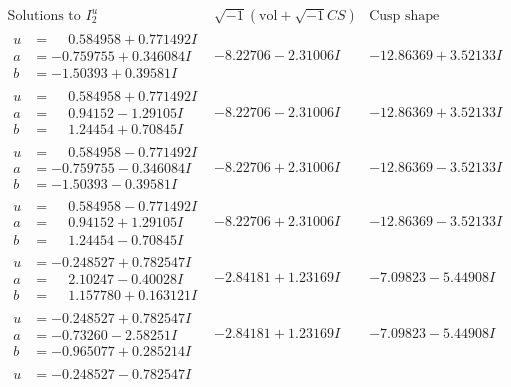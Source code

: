 \documentclass[1p]{elsarticle_modified}
\theoremstyle{definition}
\newcommand{\I}{\sqrt{-1}}
\begin{document}
$$\begin{array}{c|c|c}  
\text{Solutions to }I^u_{2}& \I (\text{vol} + \sqrt{-1}CS) & \text{Cusp shape}\\
 \hline 
\begin{aligned}
u &= \phantom{-}0.584958 + 0.771492 I \\
a &= -0.759755 + 0.346084 I \\
b &= -1.50393 + 0.39581 I\end{aligned}
 & -8.22706 - 2.31006 I & -12.86369 + 3.52133 I \\ \hline\begin{aligned}
u &= \phantom{-}0.584958 + 0.771492 I \\
a &= \phantom{-}0.94152 - 1.29105 I \\
b &= \phantom{-}1.24454 + 0.70845 I\end{aligned}
 & -8.22706 - 2.31006 I & -12.86369 + 3.52133 I \\ \hline\begin{aligned}
u &= \phantom{-}0.584958 - 0.771492 I \\
a &= -0.759755 - 0.346084 I \\
b &= -1.50393 - 0.39581 I\end{aligned}
 & -8.22706 + 2.31006 I & -12.86369 - 3.52133 I \\ \hline\begin{aligned}
u &= \phantom{-}0.584958 - 0.771492 I \\
a &= \phantom{-}0.94152 + 1.29105 I \\
b &= \phantom{-}1.24454 - 0.70845 I\end{aligned}
 & -8.22706 + 2.31006 I & -12.86369 - 3.52133 I \\ \hline\begin{aligned}
u &= -0.248527 + 0.782547 I \\
a &= \phantom{-}2.10247 - 0.40028 I \\
b &= \phantom{-}1.157780 + 0.163121 I\end{aligned}
 & -2.84181 + 1.23169 I & -7.09823 - 5.44908 I \\ \hline\begin{aligned}
u &= -0.248527 + 0.782547 I \\
a &= -0.73260 - 2.58251 I \\
b &= -0.965077 + 0.285214 I\end{aligned}
 & -2.84181 + 1.23169 I & -7.09823 - 5.44908 I \\ \hline\begin{aligned}
u &= -0.248527 - 0.782547 I \\

\end{aligned}
\end{array}$$
\end{document}
